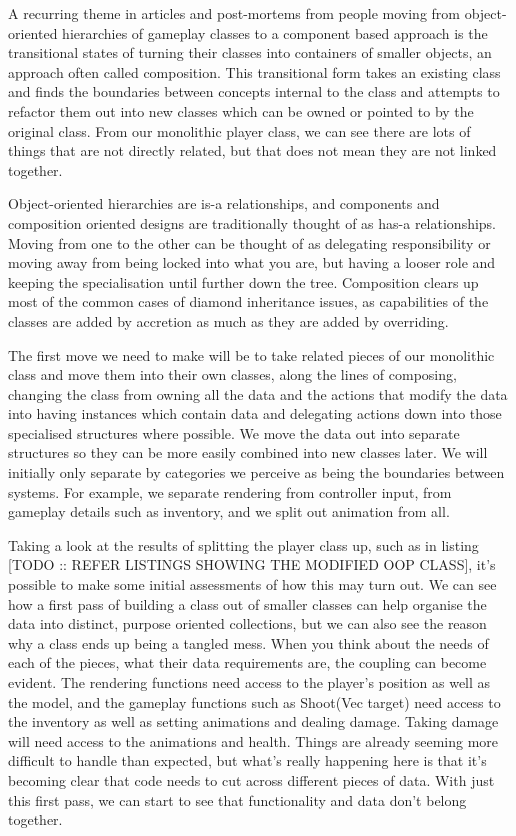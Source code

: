 \documentclass[a4paper,12pt]{article}
\begin{document}
A recurring theme in articles and post-mortems from people moving from object-oriented hierarchies of gameplay classes to a component based approach is the transitional states of turning their classes into containers of smaller objects, an approach often called composition.
This transitional form takes an existing class and finds the boundaries between concepts internal to the class and attempts to refactor them out into new classes which can be owned or pointed to by the original class.
From our monolithic player class, we can see there are lots of things that are not directly related, but that does not mean they are not linked together.

Object-oriented hierarchies are is-a relationships, and components and composition oriented designs are traditionally thought of as has-a relationships.
Moving from one to the other can be thought of as delegating responsibility or moving away from being locked into what you are, but having a looser role and keeping the specialisation until further down the tree.
Composition clears up most of the common cases of diamond inheritance issues, as capabilities of the classes are added by accretion as much as they are added by overriding.

The first move we need to make will be to take related pieces of our monolithic class and move them into their own classes, along the lines of composing, changing the class from owning all the data and the actions that modify the data into having instances which contain data and delegating actions down into those specialised structures where possible.
We move the data out into separate structures so they can be more easily combined into new classes later.
We will initially only separate by categories we perceive as being the boundaries between systems.
For example, we separate rendering from controller input, from gameplay details such as inventory, and we split out animation from all.

Taking a look at the results of splitting the player class up, such as in listing [TODO :: REFER LISTINGS SHOWING THE MODIFIED OOP CLASS], it's possible to make some initial assessments of how this may turn out.
We can see how a first pass of building a class out of smaller classes can help organise the data into distinct, purpose oriented collections, but we can also see the reason why a class ends up being a tangled mess.
When you think about the needs of each of the pieces, what their data requirements are, the coupling can become evident.
The rendering functions need access to the player's position as well as the model, and the gameplay functions such as Shoot(Vec target) need access to the inventory as well as setting animations and dealing damage.
Taking damage will need access to the animations and health.
Things are already seeming more difficult to handle than expected, but what's really happening here is that it's becoming clear that code needs to cut across different pieces of data.
With just this first pass, we can start to see that functionality and data don't belong together.
\end{document}
